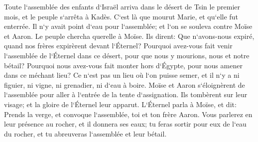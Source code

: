 \verse Toute l`assemblée des enfants d`Israël arriva dans le désert de Tsin le premier mois, et le peuple s`arrêta à Kadès. C`est là que mourut Marie, et qu`elle fut enterrée. 
\verse Il n`y avait point d`eau pour l`assemblée; et l`on se souleva contre Moïse et Aaron. 
\verse Le peuple chercha querelle à Moïse. Ils dirent: Que n`avons-nous expiré, quand nos frères expirèrent devant l`Éternel? 
\verse Pourquoi avez-vous fait venir l`assemblée de l`Éternel dans ce désert, pour que nous y mourions, nous et notre bétail? 
\verse Pourquoi nous avez-vous fait monter hors d`Égypte, pour nous amener dans ce méchant lieu? Ce n`est pas un lieu où l`on puisse semer, et il n`y a ni figuier, ni vigne, ni grenadier, ni d`eau à boire. 
\verse Moïse et Aaron s`éloignèrent de l`assemblée pour aller à l`entrée de la tente d`assignation. Ils tombèrent sur leur visage; et la gloire de l`Éternel leur apparut. 
\verse L`Éternel parla à Moïse, et dit: 
\verse Prends la verge, et convoque l`assemblée, toi et ton frère Aaron. Vous parlerez en leur présence au rocher, et il donnera ses eaux; tu feras sortir pour eux de l`eau du rocher, et tu abreuveras l`assemblée et leur bétail. 
